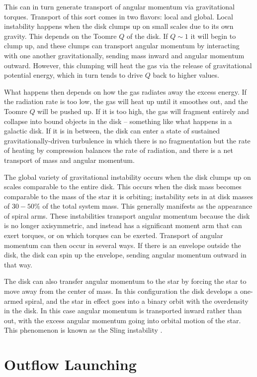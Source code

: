 This can in turn generate transport of angular momentum via gravitational torques. Transport of this sort comes in two flavors: local and global. Local instability happens when the disk clumps up on small scales due to its own gravity. This depends on the Toomre $Q$ of the disk. If $Q\sim 1$ it will begin to clump up, and these clumps can transport angular momentum by interacting with one another gravitationally, sending mass inward and angular momentum outward. However, this clumping will heat the gas via the release of gravitational potential energy, which in turn tends to drive $Q$ back to higher values.

What happens then depends on how the gas radiates away the excess energy. If the radiation rate is too low, the gas will heat up until it smoothes out, and the Toomre $Q$ will be pushed up. If it is too high, the gas will fragment entirely and collapse into bound objects in the disk -- something like what happens in a galactic disk. If it is in between, the disk can enter a state of sustained gravitationally-driven turbulence in which there is no fragmentation but the rate of heating by compression balances the rate of radiation, and there is a net transport of mass and angular momentum.

The global variety of gravitational instability occurs when the disk clumps up on scales comparable to the entire disk. This occurs when the disk mass becomes comparable to the mass of the star it is orbiting; instability sets in at disk masses of $30-50\%$ of the total system mass. This generally manifests as the appearance of spiral arms. These instabilities transport angular momentum because the disk is no longer axisymmetric, and instead has a significant moment arm that can exert torques, or on which torques can be exerted. Transport of angular momentum can then occur in several ways. If there is an envelope outside the disk, the disk can spin up the envelope, sending angular momentum outward in that way.

The disk can also transfer angular momentum to the star by forcing the star to move away from the center of mass. In this configuration the disk develops a one-armed spiral, and the star in effect goes into a binary orbit with the overdensity in the disk. In this case angular momentum is transported inward rather than out, with the excess angular momentum going into orbital motion of the star. This phenomenon is known as the Sling instability \citet{shu90a}.

\section{Outflow Launching}

